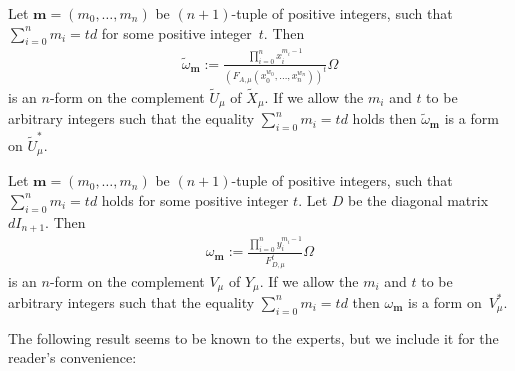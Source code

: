 \documentclass[11pt]{article}
\numberwithin{equation}{section}
\begin{document}
\begin{notation}Let $\mathbf{m}=(m_0,\dots,m_n)$ be $(n+1)$-tuple of positive integers, such that $\sum\limits_{i=0}^n m_i =td$ for some positive integer~$t$. Then
\begin{gather*} \tilde{\omega}_{\mathbf{m}}:= \frac{\prod\limits_{i=0}^n x_i^{m_i-1}}{(F_{A,\mu}(x_0^{w_0},\dots,x_n^{w_n}))^t} \Omega\end{gather*}
is an $n$-form on the complement $\tilde{U}_{\mu}$ of $\tilde{X}_{\mu}$. If we allow the $m_i$ and $t$ to be arbitrary integers such that the equality $\sum\limits_{i=0}^n m_i=td$ holds then $\tilde{\omega}_{\mathbf{m}}$ is a form on $\tilde{U}^*_{\mu}$.

Let $\mathbf{m}=(m_0,\dots,m_n)$ be $(n+1)$-tuple of positive integers, such that $\sum\limits_{i=0}^n m_i =td$ holds for some positive integer $t$. Let $D$ be the diagonal matrix $d I_{n+1}$. Then
\begin{gather*} \omega_{\mathbf{m}}:= \frac{\prod\limits_{i=0}^n y_i^{m_i-1}}{F_{D,\mu}^t} \Omega\end{gather*}
is an $n$-form on the complement $V_{\mu}$ of $Y_{\mu}$. If we allow the $m_i$ and $t$ to be arbitrary integers such that the equality $\sum\limits_{i=0}^n m_i=td$ then $\omega_{\mathbf{m}}$ is a form on~$V^*_{\mu}$.
\end{notation}

The following result seems to be known to the experts, but we include it for the reader's convenience:
\end{document}
